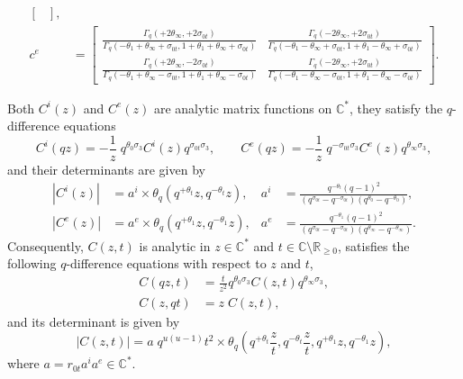 \documentclass[a4paper,reqno,11pt]{amsart}
\numberwithin{equation}{section}
\numberwithin{figure}{section}
\theoremstyle{plain}
\theoremstyle{remark}
\numberwithin{rhp}{section}
\begin{document}
\begin{align*}
\begin{bmatrix}
    \end{bmatrix},\\
    c^e&=\begin{bmatrix}
        \displaystyle\frac{\Gamma_q(+2\theta_\infty,+2\sigma_{0t})}{\Gamma_q(-\theta_1+\theta_\infty+\sigma_{0t},1+\theta_1+\theta_\infty+\sigma_{0t})} &
        \displaystyle\frac{\Gamma_q(-2\theta_\infty,+2\sigma_{0t})}{\Gamma_q(-\theta_1-\theta_\infty+\sigma_{0t},1+\theta_1-\theta_\infty+\sigma_{0t})}\\
        \displaystyle\frac{\Gamma_q(+2\theta_\infty,-2\sigma_{0t})}{\Gamma_q(-\theta_1+\theta_\infty-\sigma_{0t},1+\theta_1+\theta_\infty-\sigma_{0t})} &
        \displaystyle\frac{\Gamma_q(-2\theta_\infty,+2\sigma_{0t})}{\Gamma_q(-\theta_1-\theta_\infty-\sigma_{0t},1+\theta_1-\theta_\infty-\sigma_{0t})}
    \end{bmatrix}.
\end{align*}





Both $C^i(z)$ and $C^e(z)$ are analytic matrix functions on $\mathbb{C}^*$, they satisfy the $q$-difference equations
\begin{equation*}
    C^i(qz)=-\frac{1}{z}\;q^{\theta_0 \sigma_3}C^i(z)q^{\sigma_{0t}\sigma_3},\qquad
    C^e(qz)=-\frac{1}{z}\;q^{-\sigma_{0t} \sigma_3}C^e(z)q^{\theta_\infty\sigma_3},
\end{equation*}
and their determinants are given by
\begin{equation}\label{eq:cdets}
\begin{aligned}
    |C^i(z)|&=a^i\times \theta_q(q^{+\theta_t}z,q^{-\theta_t}z), & a^i&=\frac{q^{-\theta_t}(q-1)^2}{(q^{\sigma_{0t}}-q^{-\sigma_{0t}})(q^{\theta_0}-q^{-\theta_0})},\\
    |C^e(z)|&=a^e\times \theta_q(q^{+\theta_1}z,q^{-\theta_1}z),
    & a^e&=\frac{q^{-\theta_1}(q-1)^2}{(q^{\sigma_{0t}}-q^{-\sigma_{0t}})(q^{\theta_\infty}-q^{-\theta_\infty})}.
\end{aligned}
\end{equation}
Consequently, $C(z,t)$ is analytic in $z\in\mathbb{C}^*$ and $t\in \mathbb{C}\setminus\mathbb{R}_{\geq 0}$, satisfies the following $q$-difference equations with respect to $z$ and $t$,
\begin{align*}
    C(qz,t)&=\frac{t}{z^2}q^{\theta_0\sigma_3}C(z,t)q^{\theta_\infty\sigma_3},\\
    C(z,qt)&=z\;C(z,t),
\end{align*}
and its determinant is given by
\begin{equation*}
|C(z,t)|=a\; q^{u(u-1)}t^2\times \theta_q\left(q^{+\theta_t}\frac{z}{t},q^{-\theta_t}\frac{z}{t},q^{+\theta_1}z,q^{-\theta_1}z\right),
\end{equation*}
where $a=r_{0t}a^i a^e\in\mathbb{C}^*$.
\end{document}
